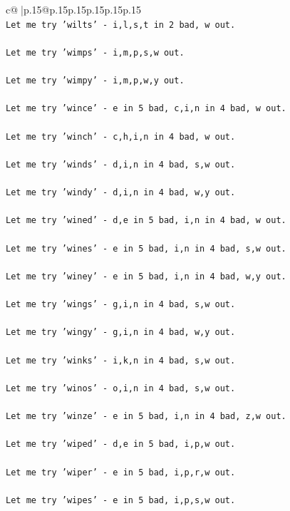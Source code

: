 \documentclass{article}
\begin{document}
{\begin{supertabular}{c@{$\;$}|p{.15\linewidth}@{}p{.15\linewidth}p{.15\linewidth}p{.15\linewidth}p{.15\linewidth}p{.15\linewidth}}
{{{\\ 
\texttt{Let me try 'wilts' {-} i,l,s,t in 2 bad, w out. } \\
\\ 
\texttt{Let me try 'wimps' {-} i,m,p,s,w out. } \\
\\ 
\texttt{Let me try 'wimpy' {-} i,m,p,w,y out. } \\
\\ 
\texttt{Let me try 'wince' {-} e in 5 bad, c,i,n in 4 bad, w out. } \\
\\ 
\texttt{Let me try 'winch' {-} c,h,i,n in 4 bad, w out. } \\
\\ 
\texttt{Let me try 'winds' {-} d,i,n in 4 bad, s,w out. } \\
\\ 
\texttt{Let me try 'windy' {-} d,i,n in 4 bad, w,y out. } \\
\\ 
\texttt{Let me try 'wined' {-} d,e in 5 bad, i,n in 4 bad, w out. } \\
\\ 
\texttt{Let me try 'wines' {-} e in 5 bad, i,n in 4 bad, s,w out. } \\
\\ 
\texttt{Let me try 'winey' {-} e in 5 bad, i,n in 4 bad, w,y out. } \\
\\ 
\texttt{Let me try 'wings' {-} g,i,n in 4 bad, s,w out. } \\
\\ 
\texttt{Let me try 'wingy' {-} g,i,n in 4 bad, w,y out. } \\
\\ 
\texttt{Let me try 'winks' {-} i,k,n in 4 bad, s,w out. } \\
\\ 
\texttt{Let me try 'winos' {-} o,i,n in 4 bad, s,w out. } \\
\\ 
\texttt{Let me try 'winze' {-} e in 5 bad, i,n in 4 bad, z,w out. } \\
\\ 
\texttt{Let me try 'wiped' {-} d,e in 5 bad, i,p,w out. } \\
\\ 
\texttt{Let me try 'wiper' {-} e in 5 bad, i,p,r,w out. } \\
\\ 
\texttt{Let me try 'wipes' {-} e in 5 bad, i,p,s,w out. } \\
}}}
\end{supertabular}}
\end{document}

